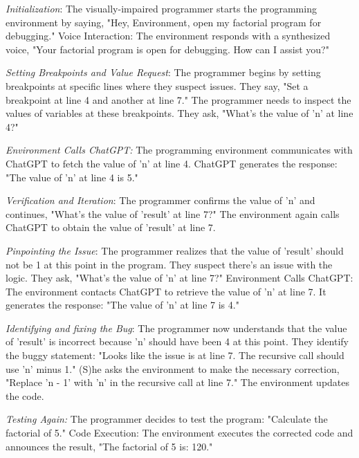 {\em Initialization}: The visually-impaired programmer starts the
programming environment by saying, "Hey, Environment, open my
factorial program for debugging."  Voice Interaction: The environment
responds with a synthesized voice, "Your factorial program is open for
debugging. How can I assist you?"

{\em Setting Breakpoints and Value Request}: The programmer begins by
setting breakpoints at specific lines where they suspect issues. They
say, "Set a breakpoint at line 4 and another at line 7." The
programmer needs to inspect the values of variables at these
breakpoints. They ask, "What's the value of 'n' at line 4?"

{\em Environment Calls ChatGPT:} The programming environment
communicates with ChatGPT to fetch the value of 'n' at line 4.
ChatGPT generates the response: "The value of 'n' at line 4 is 5."


{\em Verification and Iteration}: The programmer confirms the value of
'n' and continues, "What's the value of 'result' at line 7?"  The
environment again calls ChatGPT to obtain the value of 'result' at
line 7.

{\em Pinpointing the Issue}: The programmer realizes that the value of
'result' should not be 1 at this point in the program. They suspect
there's an issue with the logic.  They ask, "What's the value of 'n'
at line 7?"  Environment Calls ChatGPT: The environment contacts
ChatGPT to retrieve the value of 'n' at line 7. It generates the
response: "The value of 'n' at line 7 is 4."

{\em Identifying and fixing the Bug}: The programmer now understands
that the value of 'result' is incorrect because 'n' should have been 4
at this point. They identify the buggy statement: "Looks like the
issue is at line 7. The recursive call should use 'n' minus 1."  (S)he
asks the environment to make the necessary correction, "Replace 'n -
1' with 'n' in the recursive call at line 7." The environment updates
the code.

{\em Testing Again:} The programmer decides to test the program: "Calculate the factorial of 5."  Code Execution: The
environment executes the corrected code and announces the result, "The
factorial of 5 is: 120."

